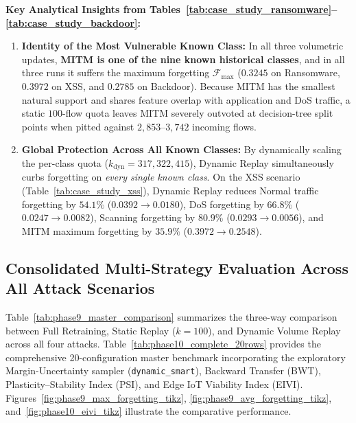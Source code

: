 \textbf{Key Analytical Insights from Tables~\ref{tab:case_study_ransomware}--\ref{tab:case_study_backdoor}:}
\begin{enumerate}
    \item \textbf{Identity of the Most Vulnerable Known Class:} In all three volumetric updates, \textbf{MITM is one of the nine known historical classes}, and in all three runs it suffers the maximum forgetting $\mathcal{F}_{\max}$ ($0.3245$ on Ransomware, $0.3972$ on XSS, and $0.2785$ on Backdoor). Because MITM has the smallest natural support and shares feature overlap with application and DoS traffic, a static $100$-flow quota leaves MITM severely outvoted at decision-tree split points when pitted against $2{,}853\text{--}3{,}742$ incoming flows.
    \item \textbf{Global Protection Across All Known Classes:} By dynamically scaling the per-class quota ($k_{\text{dyn}} = 317, 322, 415$), Dynamic Replay simultaneously curbs forgetting on \emph{every single known class}. On the XSS scenario (Table~\ref{tab:case_study_xss}), Dynamic Replay reduces Normal traffic forgetting by $54.1\%$ ($0.0392 \rightarrow 0.0180$), DoS forgetting by $66.8\%$ ($0.0247 \rightarrow 0.0082$), Scanning forgetting by $80.9\%$ ($0.0293 \rightarrow 0.0056$), and MITM maximum forgetting by $35.9\%$ ($0.3972 \rightarrow 0.2548$).
\end{enumerate}

\subsection{Consolidated Multi-Strategy Evaluation Across All Attack Scenarios}
\label{subsec:consolidated_phase9_10}

Table~\ref{tab:phase9_master_comparison} summarizes the three-way comparison between Full Retraining, Static Replay ($k=100$), and Dynamic Volume Replay across all four attacks. Table~\ref{tab:phase10_complete_20rows} provides the comprehensive 20-configuration master benchmark incorporating the exploratory Margin-Uncertainty sampler (\texttt{dynamic\_smart}), Backward Transfer (BWT), Plasticity--Stability Index (PSI), and Edge IoT Viability Index (EIVI). Figures~\ref{fig:phase9_max_forgetting_tikz}, \ref{fig:phase9_avg_forgetting_tikz}, and~\ref{fig:phase10_eivi_tikz} illustrate the comparative performance.

